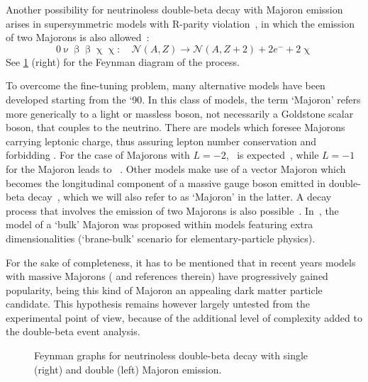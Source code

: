 Another possibility for neutrinoless double-beta decay with Majoron emission
arises in supersymmetric models with R-parity violation~\cite{Masiero1990,
Mohpatra2004}, in which the emission of two Majorons is also
allowed~\cite{Mohpatra1988}:
\[
  0\upnu\upbeta\upbeta\upchi\upchi:\quad
    \mathcal{N}(A,Z) \longrightarrow \mathcal{N}(A,Z+2) + 2e^- + 2\upchi
\]
See \cref{fig:nbb:majfeydiag} (right) for the Feynman diagram of the process.

To overcome the fine-tuning problem, many alternative models have been
developed starting from the `90. In this class of models, the term `Majoron'
refers more generically to a light or massless boson, not necessarily a
Goldstone scalar boson, that couples to the neutrino. There are models which
foresee Majorons carrying leptonic charge, thus assuring lepton number
conservation and forbidding \onbb. For the case of Majorons with $L = −2$,
\onbbx\ is expected~\cite{Burgess1993}, while $L = −1$ for the Majoron leads to
\onbbxx~\cite{Burgess1994}. Other models make use of a vector Majoron which
becomes the longitudinal component of a massive gauge boson emitted in
double-beta decay~\cite{Carone1993}, which we will also refer to as `Majoron'
in the latter. A decay process that involves the emission of two Majorons is
also possible~\cite{Bamert1995}.  In~\cite{Mohpatra2000}, the model of a `bulk'
Majoron was proposed within models featuring extra dimensionalities
(`brane-bulk' scenario for elementary-particle physics).

For the sake of completeness, it has to be mentioned that in recent years
models with massive Majorons (\cite{Blum2018} and references therein) have
progressively gained popularity, being this kind of Majoron an appealing dark
matter particle candidate. This hypothesis remains however largely untested
from the experimental point of view, because of the additional level of
complexity added to the double-beta event analysis.

\begin{figure}
  \centering%
  \caption{%
    Feynman graphs for neutrinoless double-beta decay with single (right) and
    double (left) Majoron emission.
  }\label{fig:nbb:majfeydiag}
\end{figure}

